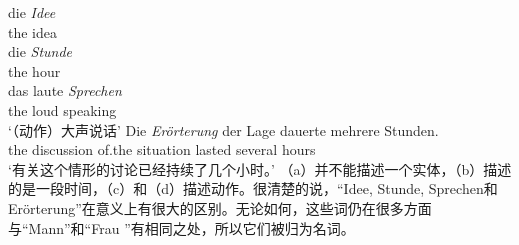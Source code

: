 \eal
\ex 
\gll die \emph{Idee}\\
	the idea\\
\ex 
\gll die \emph{Stunde}\\
	 the hour\\
\ex 
\gll das laute \emph{Sprechen}\\
     the loud speaking\\
\glt `（动作）大声说话'
\ex 
\gll Die \emph{Erörterung} der Lage dauerte mehrere Stunden.\\
     the discussion of.the situation lasted several hours\\
\glt `有关这个情形的讨论已经持续了几个小时。'
\zl
（a）并不能描述一个实体，（b）描述的是一段时间，（c）和（d）描述动作。很清楚的说，“Idee, Stunde, Sprechen和 Erörterung”在意义上有很大的区别。无论如何，这些词仍在很多方面与“Mann”和“Frau ”有相同之处，所以它们被归为名词。


